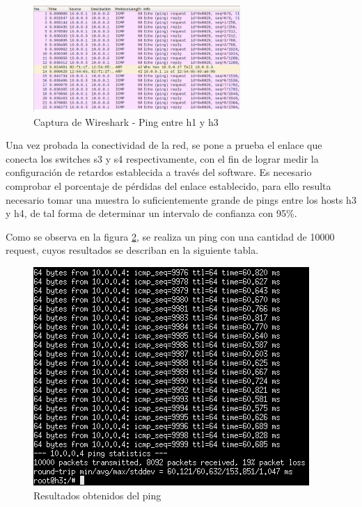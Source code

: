 \documentclass[10pt]{article}
\begin{document}
\begin{figure}[H]
    \centering
    \includegraphics[width=0.7\textwidth]{Imagenes/item01_ping_h1-h3_Wireshark.png}
    \caption{Captura de Wireshark - Ping entre h1 y h3}
    \label{fig:item01_h1_h3_Wire}
\end{figure}


\begin{multicols}{2}

\noindent
Una vez probada la conectividad de la red, se pone a prueba el enlace que conecta los switches s3 y s4 respectivamente, con el fin de lograr medir la configuración de retardos establecida a través del software. Es necesario comprobar el porcentaje de pérdidas del enlace establecido, para ello resulta necesario tomar una muestra lo suficientemente grande de pings entre los hosts h3 y h4, de tal forma de determinar un intervalo de confianza con 95\%. \newline

\noindent
Como se observa en la figura \ref{fig:ping_10000}, se realiza un ping con una cantidad de 10000 request, cuyos resultados se describan en la siguiente tabla.\newline


\columnbreak

\begin{figure}[H]
    \centering
    \includegraphics[width=0.8\linewidth]{Imagenes/ping_10000.png}
    \caption{Resultados obtenidos del ping}
    \label{fig:ping_10000}
\end{figure}

\end{multicols}
\end{document}

